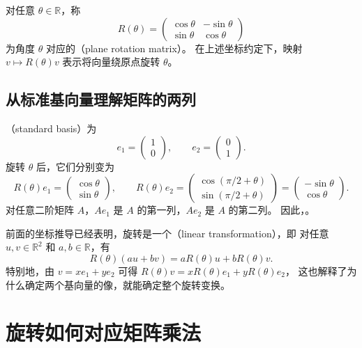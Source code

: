 \documentclass[UTF8,12pt,a4paper,fontset=fandol]{ctexart}
\begin{document}
\begin{definition}[平面旋转矩阵]
对任意 $\theta\in\mathbb R$，称
\begin{equation}
  R(\theta)=\begin{pmatrix}
    \cos\theta&-\sin\theta\\
    \sin\theta&\cos\theta
  \end{pmatrix}
  \label{eq:rotation-matrix}
\end{equation}
为角度 $\theta$ 对应的（plane rotation matrix）。
在上述坐标约定下，映射 $v\mapsto R(\theta)v$ 表示将向量绕原点旋转 $\theta$。
\end{definition}


\subsection{从标准基向量理解矩阵的两列}
（standard basis）为
\[
  e_1=\begin{pmatrix}1\\0\end{pmatrix},\qquad
  e_2=\begin{pmatrix}0\\1\end{pmatrix}.
\]
旋转 $\theta$ 后，它们分别变为
\[
  R(\theta)e_1=\begin{pmatrix}\cos\theta\\\sin\theta\end{pmatrix},\qquad
  R(\theta)e_2=
  \begin{pmatrix}\cos(\pi/2+\theta)\\\sin(\pi/2+\theta)\end{pmatrix}
  =\begin{pmatrix}-\sin\theta\\\cos\theta\end{pmatrix}.
\]
对任意二阶矩阵 $A$，$Ae_1$ 是 $A$ 的第一列，$Ae_2$ 是 $A$ 的第二列。
因此，。

前面的坐标推导已经表明，旋转是一个（linear transformation），即
对任意 $u,v\in\mathbb R^2$ 和 $a,b\in\mathbb R$，有
\[
  R(\theta)(au+bv)=aR(\theta)u+bR(\theta)v.
\]
特别地，由 $v=xe_1+ye_2$ 可得
$R(\theta)v=xR(\theta)e_1+yR(\theta)e_2$，
这也解释了为什么确定两个基向量的像，就能确定整个旋转变换。

\section{旋转如何对应矩阵乘法}
\end{document}
